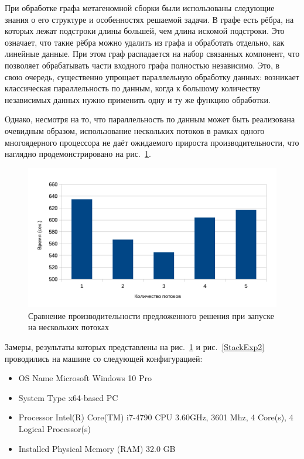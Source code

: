 При обработке графа метагеномной сборки были использованы следующие знания о его структуре и особенностях решаемой задачи. В графе есть рёбра, на которых лежат подстроки длины большей, чем длина искомой подстроки. Это означает, что такие рёбра можно удалить из графа и обработать отдельно, как линейные данные. При этом граф распадается на набор связанных компонент, что позволяет обрабатывать части входного графа полностью независимо. Это, в свою очередь, существенно упрощает параллельную обработку данных: возникает классическая параллельность по данным, когда к большому количеству независимых данных нужно применить одну и ту же функцию обработки. 

Однако, несмотря на то, что параллельность по данным может быть реализована очевидным образом, использование нескольких потоков в рамках одного многоядерного процессора не даёт ожидаемого прироста производительности, что наглядно продемонстрировано на рис.~\ref{StackExp}.

\begin{figure}
 \centering
 \includegraphics[width=\textwidth]{Ragozina/pics/Stack.pdf}
 \caption{Сравнение производительности предложенного решения при запуске на нескольких потоках }
 \label{StackExp}
\end{figure} 

Замеры, результаты которых представлены на рис.~\ref{StackExp} и рис.~\ref{StackExp2} проводились на машине со следующей конфигурацией:
\begin{itemize}
\item OS Name	Microsoft Windows 10 Pro
\item System Type x64-based PC
\item Processor	Intel(R) Core(TM) i7-4790 CPU 3.60GHz, 3601 Mhz, 4 Core(s), 4 Logical Processor(s)
\item Installed Physical Memory (RAM)	32.0 GB
\end{itemize}

